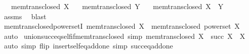 \begin{isabellebody}
\ \ \ {\isachardoublequoteopen}mem{\isacharunderscore}{\kern0pt}trans{\isacharunderscore}{\kern0pt}closed\ X{\isachardoublequoteclose}\isanewline
\ \ \ {\isachardoublequoteopen}mem{\isacharunderscore}{\kern0pt}trans{\isacharunderscore}{\kern0pt}closed\ Y{\isachardoublequoteclose}\isanewline
\ \ \ {\isachardoublequoteopen}mem{\isacharunderscore}{\kern0pt}trans{\isacharunderscore}{\kern0pt}closed\ {\isacharparenleft}{\kern0pt}X\ {\isasyminter}\ Y{\isacharparenright}{\kern0pt}{\isachardoublequoteclose}\isanewline
%
\isadelimproof
\ \ %
\endisadelimproof
%
\isatagproof
{}\isamarkupfalse%
\ assms\ \isamarkupfalse%
\ blast%
\endisatagproof
{\isafoldproof}%
%
\isadelimproof
\isanewline
%
\endisadelimproof
\isanewline
{}\isamarkupfalse%
\ mem{\isacharunderscore}{\kern0pt}trans{\isacharunderscore}{\kern0pt}closed{\isacharunderscore}{\kern0pt}powersetI{\isacharcolon}{\kern0pt}\ {\isachardoublequoteopen}mem{\isacharunderscore}{\kern0pt}trans{\isacharunderscore}{\kern0pt}closed\ X\ {\isasymLongrightarrow}\ mem{\isacharunderscore}{\kern0pt}trans{\isacharunderscore}{\kern0pt}closed\ {\isacharparenleft}{\kern0pt}powerset\ X{\isacharparenright}{\kern0pt}{\isachardoublequoteclose}\isanewline
%
\isadelimproof
\ \ %
\endisadelimproof
%
\isatagproof
{}\isamarkupfalse%
\ auto%
\endisatagproof
{\isafoldproof}%
%
\isadelimproof
\isanewline
%
\endisadelimproof
\isanewline
{}\isamarkupfalse%
\ union{\isacharunderscore}{\kern0pt}succ{\isacharunderscore}{\kern0pt}eq{\isacharunderscore}{\kern0pt}self{\isacharunderscore}{\kern0pt}if{\isacharunderscore}{\kern0pt}mem{\isacharunderscore}{\kern0pt}trans{\isacharunderscore}{\kern0pt}closed\ {\isacharbrackleft}{\kern0pt}simp{\isacharbrackright}{\kern0pt}{\isacharcolon}{\kern0pt}\ {\isachardoublequoteopen}mem{\isacharunderscore}{\kern0pt}trans{\isacharunderscore}{\kern0pt}closed\ X\ {\isasymLongrightarrow}\ {\isasymUnion}{\isacharparenleft}{\kern0pt}succ\ X{\isacharparenright}{\kern0pt}\ {\isacharequal}{\kern0pt}\ X{\isachardoublequoteclose}\isanewline
%
\isadelimproof
\ \ %
\endisadelimproof
%
\isatagproof
{}\isamarkupfalse%
\ {\isacharparenleft}{\kern0pt}auto\ simp\ flip{\isacharcolon}{\kern0pt}\ insert{\isacharunderscore}{\kern0pt}self{\isacharunderscore}{\kern0pt}eq{\isacharunderscore}{\kern0pt}add{\isacharunderscore}{\kern0pt}one\ simp{\isacharcolon}{\kern0pt}\ succ{\isacharunderscore}{\kern0pt}eq{\isacharunderscore}{\kern0pt}add{\isacharunderscore}{\kern0pt}one{\isacharparenright}{\kern0pt}%
\endisatagproof
{\isafoldproof}%
%
\isadelimproof
\isanewline
%
\endisadelimproof
\isanewline
%
\isadelimtheory
\isanewline
%
\endisadelimtheory
%
\isatagtheory
{}\isamarkupfalse%
%
\endisatagtheory
{\isafoldtheory}%
%
\isadelimtheory
%
\endisadelimtheory
%
\end{isabellebody}%
